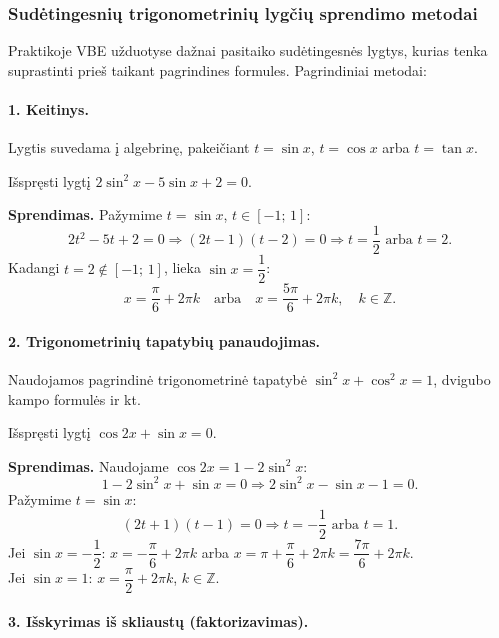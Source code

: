 \subsubsection{Sudėtingesnių trigonometrinių lygčių sprendimo metodai}

Praktikoje VBE užduotyse dažnai pasitaiko sudėtingesnės lygtys, kurias tenka suprastinti prieš taikant pagrindines formules. Pagrindiniai metodai:

\paragraph{1. Keitinys.}
Lygtis suvedama į algebrinę, pakeičiant \(t = \sin x\), \(t = \cos x\) arba \(t = \tan x\).

\begin{example}
Išspręsti lygtį \(2\sin^2 x - 5\sin x + 2 = 0\).

\textbf{Sprendimas.} Pažymime \(t = \sin x\), \(t \in [-1;\, 1]\):
\[
2t^2 - 5t + 2 = 0 \Rightarrow (2t - 1)(t - 2) = 0 \Rightarrow t = \frac{1}{2} \text{ arba } t = 2.
\]
Kadangi \(t = 2 \notin [-1;\, 1]\), lieka \(\sin x = \dfrac{1}{2}\):
\[
x = \frac{\pi}{6} + 2\pi k \quad \text{arba} \quad x = \frac{5\pi}{6} + 2\pi k,\quad k \in \mathbb{Z}.
\]
\end{example}

\paragraph{2. Trigonometrinių tapatybių panaudojimas.}
Naudojamos pagrindinė trigonometrinė tapatybė \(\sin^2 x + \cos^2 x = 1\), dvigubo kampo formulės ir kt.

\begin{example}
Išspręsti lygtį \(\cos 2x + \sin x = 0\).

\textbf{Sprendimas.} Naudojame \(\cos 2x = 1 - 2\sin^2 x\):
\[
1 - 2\sin^2 x + \sin x = 0 \Rightarrow 2\sin^2 x - \sin x - 1 = 0.
\]
Pažymime \(t = \sin x\):
\[
(2t + 1)(t - 1) = 0 \Rightarrow t = -\frac{1}{2} \text{ arba } t = 1.
\]
Jei \(\sin x = -\dfrac{1}{2}\): \(x = -\dfrac{\pi}{6} + 2\pi k\) arba \(x = \pi + \dfrac{\pi}{6} + 2\pi k = \dfrac{7\pi}{6} + 2\pi k\).\\
Jei \(\sin x = 1\): \(x = \dfrac{\pi}{2} + 2\pi k\), \(k \in \mathbb{Z}\).
\end{example}

\paragraph{3. Išskyrimas iš skliaustų (faktorizavimas).}

